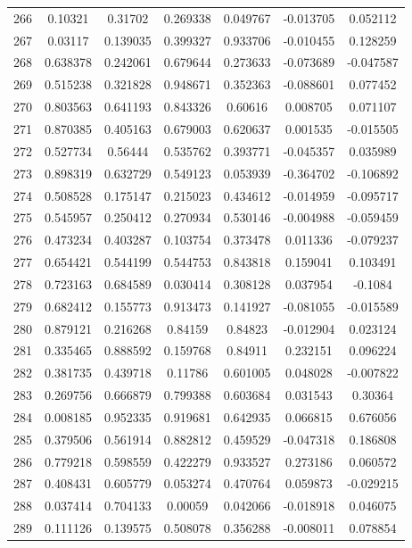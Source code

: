 \begin{table}
\begin{tabular}{c|c|c|c|c|c|c}
266 & 0.10321 & 0.31702 & 0.269338 & 0.049767 & -0.013705 & 0.052112\\
267 & 0.03117 & 0.139035 & 0.399327 & 0.933706 & -0.010455 & 0.128259\\
268 & 0.638378 & 0.242061 & 0.679644 & 0.273633 & -0.073689 & -0.047587\\
269 & 0.515238 & 0.321828 & 0.948671 & 0.352363 & -0.088601 & 0.077452\\
270 & 0.803563 & 0.641193 & 0.843326 & 0.60616 & 0.008705 & 0.071107\\
271 & 0.870385 & 0.405163 & 0.679003 & 0.620637 & 0.001535 & -0.015505\\
272 & 0.527734 & 0.56444 & 0.535762 & 0.393771 & -0.045357 & 0.035989\\
273 & 0.898319 & 0.632729 & 0.549123 & 0.053939 & -0.364702 & -0.106892\\
274 & 0.508528 & 0.175147 & 0.215023 & 0.434612 & -0.014959 & -0.095717\\
275 & 0.545957 & 0.250412 & 0.270934 & 0.530146 & -0.004988 & -0.059459\\
276 & 0.473234 & 0.403287 & 0.103754 & 0.373478 & 0.011336 & -0.079237\\
277 & 0.654421 & 0.544199 & 0.544753 & 0.843818 & 0.159041 & 0.103491\\
278 & 0.723163 & 0.684589 & 0.030414 & 0.308128 & 0.037954 & -0.1084\\
279 & 0.682412 & 0.155773 & 0.913473 & 0.141927 & -0.081055 & -0.015589\\
280 & 0.879121 & 0.216268 & 0.84159 & 0.84823 & -0.012904 & 0.023124\\
281 & 0.335465 & 0.888592 & 0.159768 & 0.84911 & 0.232151 & 0.096224\\
282 & 0.381735 & 0.439718 & 0.11786 & 0.601005 & 0.048028 & -0.007822\\
283 & 0.269756 & 0.666879 & 0.799388 & 0.603684 & 0.031543 & 0.30364\\
284 & 0.008185 & 0.952335 & 0.919681 & 0.642935 & 0.066815 & 0.676056\\
285 & 0.379506 & 0.561914 & 0.882812 & 0.459529 & -0.047318 & 0.186808\\
286 & 0.779218 & 0.598559 & 0.422279 & 0.933527 & 0.273186 & 0.060572\\
287 & 0.408431 & 0.605779 & 0.053274 & 0.470764 & 0.059873 & -0.029215\\
288 & 0.037414 & 0.704133 & 0.00059 & 0.042066 & -0.018918 & 0.046075\\
289 & 0.111126 & 0.139575 & 0.508078 & 0.356288 & -0.008011 & 0.078854\\

\end{tabular}
\end{table}
